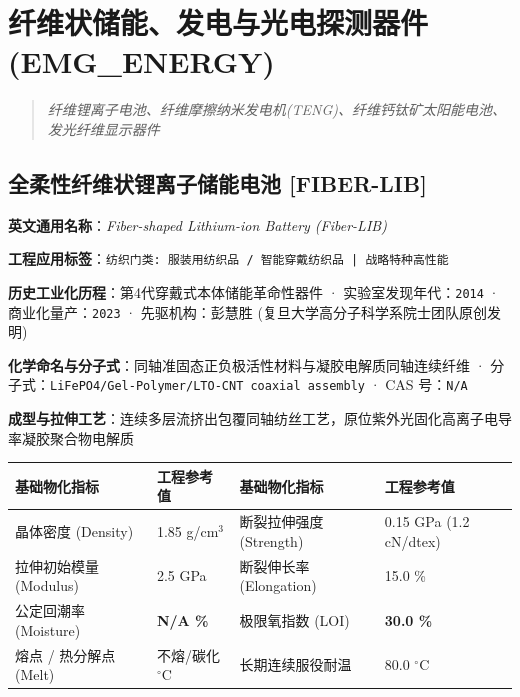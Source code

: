 \documentclass[11pt,openright,twoside,UTF8]{ctexbook}
\begin{document}
\chapter{纤维状储能、发电与光电探测器件 (EMG\_ENERGY)}
\begin{quote}
\small\itshape
纤维锂离子电池、纤维摩擦纳米发电机(TENG)、纤维钙钛矿太阳能电池、发光纤维显示器件
\end{quote}

\section{全柔性纤维状锂离子储能电池 [FIBER-LIB]}
\label{sec:fiber-lib}

\noindent\textbf{英文通用名称}：\textit{Fiber-shaped Lithium-ion Battery (Fiber-LIB)}\par
\noindent\textbf{工程应用标签}：\texttt{纺织门类: 服装用纺织品 / 智能穿戴纺织品 | 战略特种高性能}\par
\noindent\textbf{历史工业化历程}：第4代穿戴式本体储能革命性器件 · 实验室发现年代：\texttt{2014} · 商业化量产：\texttt{2023} · 先驱机构：彭慧胜 (复旦大学高分子科学系院士团队原创发明)\par
\noindent\textbf{化学命名与分子式}：同轴准固态正负极活性材料与凝胶电解质同轴连续纤维 · 分子式：\texttt{LiFePO4/Gel-Polymer/LTO-CNT coaxial assembly} · CAS 号：\texttt{N/A}\par
\noindent\textbf{成型与拉伸工艺}：连续多层流挤出包覆同轴纺丝工艺，原位紫外光固化高离子电导率凝胶聚合物电解质\par

\vspace{0.15cm}
\begin{center}
\small
\begin{tabularx}{\textwidth}{p{3.8cm}Xp{3.8cm}X}
\toprule
\textbf{基础物化指标} & \textbf{工程参考值} & \textbf{基础物化指标} & \textbf{工程参考值} \\
\midrule
晶体密度 (Density) & 1.85 g/cm$^3$ & 断裂拉伸强度 (Strength) & 0.15 GPa (1.2 cN/dtex) \\
拉伸初始模量 (Modulus) & 2.5 GPa & 断裂伸长率 (Elongation) & 15.0 \% \\
公定回潮率 (Moisture) & \textbf{N/A \%} & 极限氧指数 (LOI) & \textbf{30.0 \%} \\
熔点 / 热分解点 (Melt) & 不熔/碳化 $^\circ\mathrm{C}$ & 长期连续服役耐温 & 80.0 $^\circ\mathrm{C}$ \\
\bottomrule
\end{tabularx}
\end{center}
\vspace{0.15cm}
\end{document}
